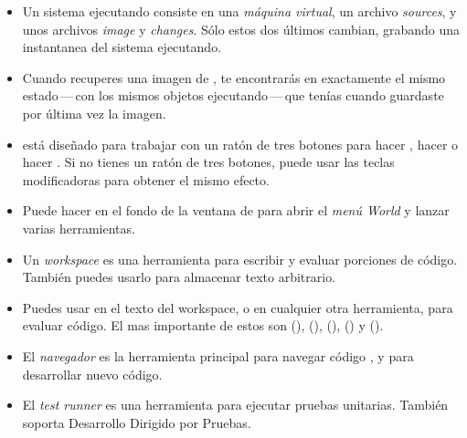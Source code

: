 \documentclass[a4paper,10pt,twoside]{book}
\begin{document}
\begin{itemize}
  \item Un sistema \pharo ejecutando consiste en una \emph{m\'aquina virtual}, un archivo \emph{sources}, y unos archivos \emph{image} y \emph{changes}. S\'olo estos dos \'ultimos cambian, grabando una instantanea del sistema ejecutando.
  \item Cuando recuperes una imagen de \pharo, te encontrar\'as en exactamente el mismo estado\,---\,con los mismos objetos ejecutando\,---\,que ten\'ias cuando guardaste por \'ultima vez la imagen.
  \item \pharo est\'a dise\~nado para trabajar con un rat\'on de tres botones para hacer \click, hacer \actclick o hacer \metaclick. Si no tienes un rat\'on de tres botones, puede usar las teclas modificadoras para obtener el mismo efecto.
  \item Puede hacer \click en el fondo de la ventana de \pharo para abrir el \emph{men\'u World} y lanzar varias herramientas.
  \item Un \emph{workspace} es una herramienta para escribir y evaluar porciones de c\'odigo. Tambi\'en puedes usarlo para almacenar texto arbitrario.
  \item Puedes usar  en el texto del workspace, o en cualquier otra herramienta, para evaluar c\'odigo. El mas importante de estos son  (),  (),  (),  () y  ().
  \item El \emph{navegador} es la herramienta principal para navegar c\'odigo \pharo, y para desarrollar nuevo c\'odigo.
  \item El \emph{test runner} es una herramienta para ejecutar pruebas unitarias. Tambi\'en soporta Desarrollo Dirigido por Pruebas.
\end{itemize}

\ifx\wholebook\relax\else 
   
   
\end{document}
